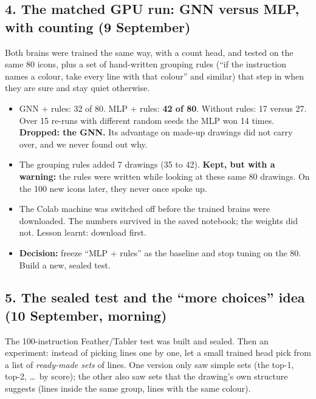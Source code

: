 \documentclass[11pt,a4paper]{article}
\begin{document}
\subsection*{4. The matched GPU run: GNN versus MLP, with counting (9 September)}

Both brains were trained the same way, with a count head, and tested on the same 80 icons, plus a set of hand-written grouping rules (``if the instruction names a colour, take every line with that colour'' and similar) that step in when they are sure and stay quiet otherwise.

\begin{itemize}[leftmargin=1.6em]
  \item GNN + rules: 32 of 80. MLP + rules: \textbf{42 of 80}. Without rules: 17 versus 27. Over 15 re-runs with different random seeds the MLP won 14 times. \textbf{Dropped: the GNN.} Its advantage on made-up drawings did not carry over, and we never found out why.
  \item The grouping rules added 7 drawings (35 to 42). \textbf{Kept, but with a warning:} the rules were written while looking at these same 80 drawings. On the 100 new icons later, they never once spoke up.
  \item The Colab machine was switched off before the trained brains were downloaded. The numbers survived in the saved notebook; the weights did not. Lesson learnt: download first.
  \item \textbf{Decision:} freeze ``MLP + rules'' as the baseline and stop tuning on the 80. Build a new, sealed test.
\end{itemize}

\subsection*{5. The sealed test and the ``more choices'' idea (10 September, morning)}

The 100-instruction Feather/Tabler test was built and sealed.
Then an experiment: instead of picking lines one by one, let a small trained head pick from a list of \emph{ready-made sets} of lines. One version only saw simple sets (the top-1, top-2, \dots\ by score); the other also saw sets that the drawing's own structure suggests (lines inside the same group, lines with the same colour).
\end{document}
